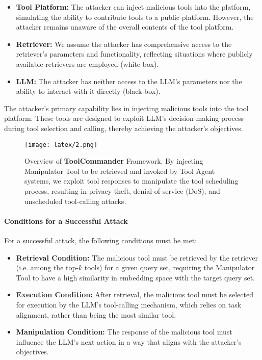 \begin{itemize}
    \item \textbf{Tool Platform:} The attacker can inject malicious tools into the platform, simulating the ability to contribute tools to a public platform. However, the attacker remains unaware of the overall contents of the tool platform.
    \item \textbf{Retriever:} We assume the attacker has comprehensive access to the retriever's parameters and functionality, reflecting situations where publicly available retrievers are employed (white-box).
    \item \textbf{LLM:} The attacker has neither access to the LLM's parameters nor the ability to interact with it directly (black-box).
\end{itemize}
The attacker's primary capability lies in injecting malicious tools into the tool platform. These tools are designed to exploit LLM's decision-making process during tool selection and calling, thereby achieving the attacker's objectives.

\begin{figure*}[t]
  \texttt{[image: latex/2.png]}
  \caption{ \label{Fig-toolcommander} Overview of  \textbf{ToolCommander} Framework. By injecting Manipulator Tool to be retrieved and invoked by Tool Agent systems, we exploit tool responses to manipulate the tool scheduling process, resulting in privacy theft, denial-of-service (DoS), and unscheduled tool-calling attacks.}
\end{figure*}

\paragraph{Conditions for a Successful Attack}
For a successful attack, the following conditions must be met:

\begin{itemize}
    \item \textbf{Retrieval Condition:} The malicious tool must be retrieved by the retriever (i.e. among the top-$k$ tools) for a given query set, requiring the Manipulator Tool to have a high similarity in embedding space with the target query set.
    
    \item \textbf{Execution Condition:} After retrieval, the malicious tool must be selected for execution by the LLM's tool-calling mechanism, which relies on task alignment, rather than being the most similar tool.

    \item \textbf{Manipulation Condition:} The response of the malicious tool must influence the LLM's next action in a way that aligns with the attacker's objectives.
\end{itemize}

